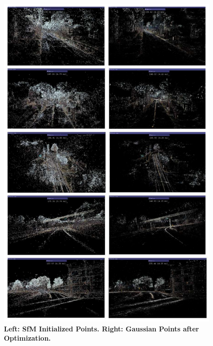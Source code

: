 \begin{figure}[ht]
    \centering
    \includegraphics[width=0.8\linewidth]{figs_compressed/reconstruction_compressed.pdf}
    \caption{\textbf{Left: SfM Initialized Points. Right: Gaussian Points after Optimization.}}
    \label{fig:reconstruction-appendix}
\end{figure}


